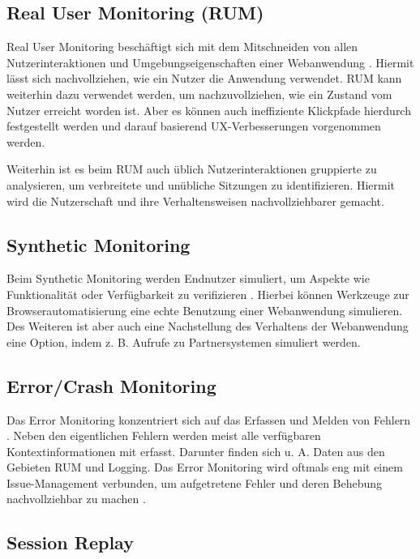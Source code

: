 \subsection{Real User Monitoring (RUM)}


Real User Monitoring beschäftigt sich mit dem Mitschneiden von allen Nutzerinteraktionen und Umgebungseigenschaften einer Webanwendung \cite{IdentifyingWebPerformanceDegradations}. Hiermit lässt sich nachvollziehen, wie ein Nutzer die Anwendung verwendet. RUM kann weiterhin dazu verwendet werden, um nachzuvollziehen, wie ein Zustand vom Nutzer erreicht worden ist. Aber es können auch ineffiziente Klickpfade hierdurch festgestellt werden und darauf basierend UX-Verbesserungen vorgenommen werden.

Weiterhin ist es beim RUM auch üblich Nutzerinteraktionen gruppierte zu analysieren, um verbreitete und unübliche Sitzungen zu identifizieren. Hiermit wird die Nutzerschaft und ihre Verhaltensweisen nachvollziehbarer gemacht.

\subsection{Synthetic Monitoring}

Beim Synthetic Monitoring werden Endnutzer simuliert, um Aspekte wie Funktionalität oder Verfügbarkeit zu verifizieren \cite{IdentifyingWebPerformanceDegradations}. Hierbei können Werkzeuge zur Browserautomatisierung eine echte Benutzung einer Webanwendung simulieren. Des Weiteren ist aber auch eine Nachstellung des Verhaltens der Webanwendung eine Option, indem z. B. Aufrufe zu Partnersystemen simuliert werden.

\subsection{Error/Crash Monitoring}

Das Error Monitoring konzentriert sich auf das Erfassen und Melden von Fehlern \cite{CrashbinCrashMonitoring}. Neben den eigentlichen Fehlern werden meist alle verfügbaren Kontextinformationen mit erfasst. Darunter finden sich u. A. Daten aus den Gebieten RUM und Logging. Das Error Monitoring wird oftmals eng mit einem Issue-Management verbunden, um aufgetretene Fehler und deren Behebung nachvollziehbar zu machen \cite{CrashbinCrashMonitoring}.

\subsection{Session Replay}

